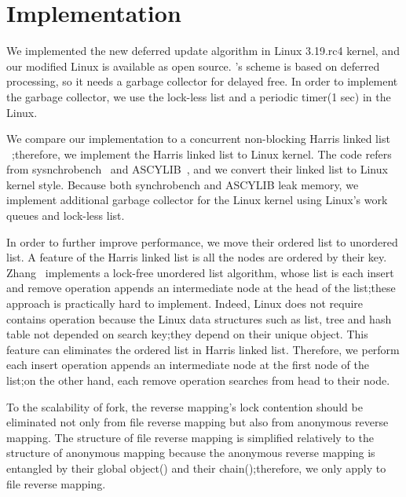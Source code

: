 \section{Implementation}\label{sec:implementation}
We implemented the new deferred update algorithm in Linux 3.19.rc4 kernel, and
our modified Linux is available as open source.
's scheme is based on deferred processing, so it needs a garbage
collector for delayed free.
In order to implement the garbage collector, we use the lock-less list and a
periodic timer(1 sec) in the Linux.

We compare our  implementation to a concurrent non-blocking Harris
linked list ~\cite{Harris2001Lockfree};therefore, we implement the Harris linked list
to Linux kernel.
The code refers from sysnchrobench~\cite{Gramoli2015Synchrobench} and
ASCYLIB~\cite{David2015ASYNCHRONIZED}, and we convert their linked list to
Linux kernel style.
Because both synchrobench and ASCYLIB leak memory, we implement additional
garbage collector for the Linux kernel using Linux's work queues and lock-less
list.

In order to further improve performance, we move their ordered list to
unordered list. 
A feature of the Harris linked list is all the nodes are ordered by
their key. 
Zhang~\cite{zhang2013practical} implements a lock-free unordered list
algorithm, whose list is each insert and remove operation appends an
intermediate node at the head of the list;these approach is practically
hard to implement.
Indeed, Linux does not require contains operation because the Linux data
structures such as list, tree and hash table not depended on search key;they
depend on their unique object.
This feature can eliminates the ordered list in Harris linked list.
Therefore, we perform each insert operation appends an intermediate node at
the first node of the list;on the other hand, each remove operation searches
from head to their node.

To the scalability of fork, the reverse mapping's lock contention should
be eliminated not only from file reverse mapping but also from anonymous reverse
mapping.
The structure of file reverse mapping is simplified relatively to the
structure of anonymous mapping because the anonymous reverse mapping is
entangled by their global object() and their
chain();therefore, we only apply  to file reverse
mapping.

